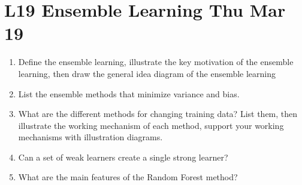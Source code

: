 \documentclass[12pt]{article}
\newenvironment{QandA}{\begin{enumerate}[label=\bfseries\arabic*.]\bfseries}
{\end{enumerate}}
\newenvironment{answered}{\par\normalfont\color{Sepia}}{}
\begin{document}
\section*{L19 Ensemble Learning \textemdash{} Thu Mar 19}
\begin{QandA}
    \item Define the ensemble learning, illustrate the key motivation of the ensemble learning, then draw the general idea diagram of the ensemble learning
    \begin{answered}
    \end{answered}

    \item List the ensemble methods that minimize variance and bias.
    \begin{answered}
    \end{answered}

    \item What are the different methods for changing training data? List them, then illustrate the working mechanism of each method, support your working mechanisms with illustration diagrams.
    \begin{answered}
    \end{answered}

    \item Can a set of weak learners create a single strong learner?
    \begin{answered}
    \end{answered}

    \item What are the main features of the Random Forest method?
    \begin{answered}
    \end{answered}

\end{QandA}
\end{document}
